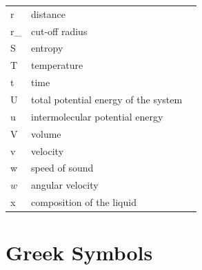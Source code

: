 {\begin{longtable}{Z B r}
		r      & distance &  \\
		r_   & cut-off radius  &  \\
		S     & entropy &  \\
		T     & temperature &  \\
		t     & time  &  \\
		U     &  total potential energy of the system &  \\
		u     & intermolecular potential energy  &  \\
		V     & volume &  \\
		v     & velocity  &  \\
		w     & speed of sound &  \\
		$w $    & angular velocity &  \\
		x     & composition of the liquid &  \\
		
		
	\end{longtable}
	
	
	\section*{Greek Symbols}
	
}
